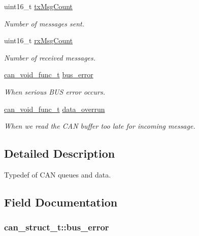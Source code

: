 \begin{DoxyCompactItemize}
uint16\+\_\+t \hyperlink{structcan__struct__t_ad13c7c5a692c2808a1f13250a726fcc3}{tx\+Msg\+Count}
\begin{DoxyCompactList}\small\item\em Number of messages sent. \end{DoxyCompactList}\item 
uint16\+\_\+t \hyperlink{structcan__struct__t_afaa8f7119b799b00f2ce4f014ec98629}{rx\+Msg\+Count}
\begin{DoxyCompactList}\small\item\em Number of received messages. \end{DoxyCompactList}\item 
\hyperlink{can_8h_a70166a12001edeee7860a1257037be44}{can\+\_\+void\+\_\+func\+\_\+t} \hyperlink{structcan__struct__t_a1d38ac37f7c83d7252cc2cd3da88b6a9}{bus\+\_\+error}
\begin{DoxyCompactList}\small\item\em When serious B\+US error occurs. \end{DoxyCompactList}\item 
\hyperlink{can_8h_a70166a12001edeee7860a1257037be44}{can\+\_\+void\+\_\+func\+\_\+t} \hyperlink{structcan__struct__t_a91068e55e2923ef1bdf723e11d5460f1}{data\+\_\+overrun}
\begin{DoxyCompactList}\small\item\em When we read the C\+AN buffer too late for incoming message. \end{DoxyCompactList}\end{DoxyCompactItemize}


\subsection{Detailed Description}
Typedef of C\+AN queues and data. 

\subsection{Field Documentation}
\subsubsection[{\texorpdfstring{bus\+\_\+error}{bus_error}}]{ can\+\_\+struct\+\_\+t\+::bus\+\_\+error}\hypertarget{structcan__struct__t_a1d38ac37f7c83d7252cc2cd3da88b6a9}{}\label{structcan__struct__t_a1d38ac37f7c83d7252cc2cd3da88b6a9}


